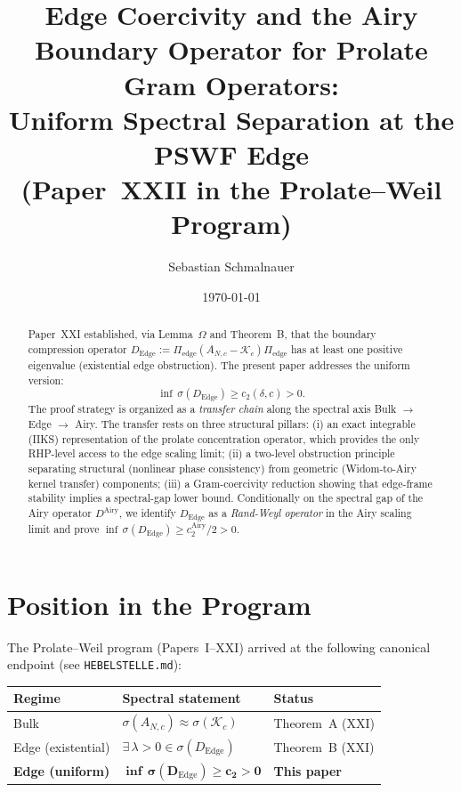 \documentclass[12pt,a4paper]{amsart}
\title[Edge Coercivity and the Airy Boundary Operator]
      {Edge Coercivity and the Airy Boundary Operator
       for Prolate Gram Operators:\\
       Uniform Spectral Separation at the PSWF Edge\\[4pt]
       \large (Paper~XXII in the Prolate--Weil Program)}
\author{Sebastian Schmalnauer}
\date{\today}
\theoremstyle{definition}
\newcommand{\Kop}{\mathcal{K}_c}
\newcommand{\Pedge}{\Pi_{\mathrm{edge}}}
\newcommand{\AN}{A_{N,c}}
\newcommand{\Dedge}{D_{\mathrm{Edge}}}
\begin{document}
\maketitle

\begin{abstract}
Paper~XXI established, via Lemma~$\Omega$ and Theorem~B,
that the boundary compression operator
$\Dedge := \Pedge(\AN - \Kop)\Pedge$
has at least one positive eigenvalue (existential edge obstruction).
The present paper addresses the uniform version:
\[
  \inf\,\sigma(\Dedge) \ge c_2(\delta,c) > 0.
\]
The proof strategy is organized as a \emph{transfer chain}
along the spectral axis Bulk $\to$ Edge $\to$ Airy.
The transfer rests on three structural pillars:
(i) an exact integrable (IIKS) representation of the
prolate concentration operator, which provides the only
RHP-level access to the edge scaling limit;
(ii) a two-level obstruction principle separating
structural (nonlinear phase consistency) from geometric
(Widom-to-Airy kernel transfer) components;
(iii) a Gram-coercivity reduction showing that
edge-frame stability implies a spectral-gap lower bound.
Conditionally on the spectral gap of the Airy operator
$D^{\mathrm{Airy}}$, we identify $\Dedge$ as a
\emph{Rand-Weyl operator} in the Airy scaling limit
and prove $\inf\,\sigma(\Dedge) \ge c_2^{\mathrm{Airy}}/2 > 0$.
\end{abstract}

\tableofcontents

\section{Position in the Program}\label{sec:position}

The Prolate--Weil program (Papers~I--XXI) arrived at the
following canonical endpoint (see \texttt{HEBELSTELLE.md}):

\begin{center}\small
\begin{tabular}{lll}
\toprule
Regime & Spectral statement & Status \\
\midrule
Bulk & $\sigma(\AN) \approx \sigma(\Kop)$ & Theorem~A (XXI) \\
Edge (existential) & $\exists\,\lambda > 0 \in \sigma(\Dedge)$ & Theorem~B (XXI) \\
\textbf{Edge (uniform)} & $\mathbf{\inf\,\sigma(\Dedge) \ge c_2 > 0}$ & \textbf{This paper} \\
\bottomrule
\end{tabular}
\end{center}
\end{document}
